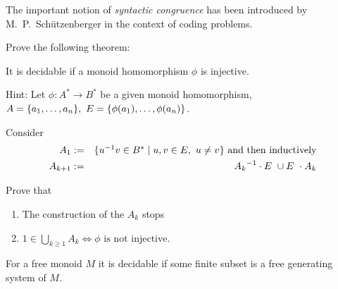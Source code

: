 The important notion of {\em syntactic congruence} has been introduced by M.\
P.\ Schü\-tzen\-berger in the context of coding problems.

\bigskip
\begin{exercise}
Prove the following theorem:
\begin{theorem}
It is decidable if a monoid homomorphism $\phi$ is injective.
\end{theorem}

Hint: Let $\phi: A^* \to B^*$ be a given monoid homomorphism, $A =
\mbox{$\{a_1, \ldots, a_n\}$},\ E = \mbox{$\{\phi(a_1), \ldots, \phi(a_n)\}$}$.

Consider
\begin{eqnarray*}
A_1 &:=& \mbox{$\{\mbox{${u}^{-1}$} v \in B^* \mid u, v \in E,\ u\neq v \}$}\text{ and then
inductively} \\
A_{k+1} &:=& \mbox{${A_k}^{-1}$} \cdot E\ \cup E\ \cdot A_k
\end{eqnarray*}

Prove that
\begin{enumerate}
  \item The construction of the $A_k$ stops
  \item $1 \in \bigcup_{k \geq 1} A_k \iff \phi\text{ is not injective}$.
\end{enumerate}

\medskip
\begin{corollary}
For a free monoid $M$ it is decidable if some finite subset is a free generating
system of $M$.
\end{corollary}
\end{exercise}
